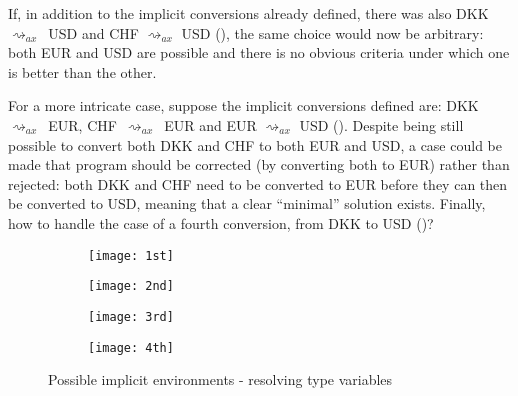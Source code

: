If, in addition to the implicit conversions already defined, there was also DKK~$\rightsquigarrow_{ax}$~USD and CHF $\rightsquigarrow_{ax}$ USD (), the same choice would now be arbitrary: both EUR and USD are possible and there is no obvious criteria under which one is better than the other.

For a more intricate case, suppose the implicit conversions defined are: DKK~$\rightsquigarrow_{ax}$~EUR, CHF~$\rightsquigarrow_{ax}$~EUR and EUR $\rightsquigarrow_{ax}$ USD (). Despite being still possible to convert both DKK and CHF to both EUR and USD, a case could be made that program should be corrected (by converting both to EUR) rather than rejected: both DKK and CHF need to be converted to EUR before they can then be converted to USD, meaning that a clear ``minimal'' solution exists. Finally, how to handle the case of a fourth conversion, from DKK to USD ()?
\begin{figure}
  \centering
  \begin{subfigure}{.20\textwidth}
    \centering
    \texttt{[image: 1st]}
    \caption{}
    \label{1st}
  \end{subfigure}
  \begin{subfigure}{.20\textwidth}
    \centering
    \texttt{[image: 2nd]}
    \caption{}
    \label{2nd}
  \end{subfigure}
  \begin{subfigure}{.20\textwidth}
    \centering
    \texttt{[image: 3rd]}
    \caption{}
    \label{3rd}
  \end{subfigure}
  \begin{subfigure}{.20\textwidth}
    \centering
    \texttt{[image: 4th]}
    \caption{}
    \label{4th}
  \end{subfigure}  
  \caption{Possible implicit environments - resolving type variables}
\end{figure}

